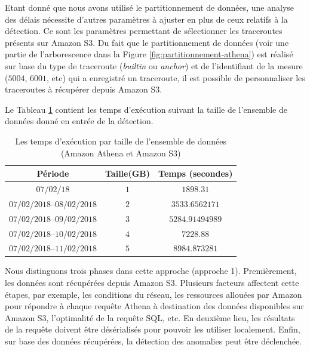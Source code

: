 Etant donné que nous avons utilisé le partitionnement de données, une analyse des délais nécessite d'autres paramètres à ajuster en plus de ceux relatifs à la détection. Ce sont les paramètres permettant de sélectionner les traceroutes présents sur Amazon S3. Du fait que le partitionnement de données (voir une partie de l'arborescence dans la Figure 	\ref{fig:partitionnement-athena}) est réalisé sur base du type de traceroute (\textit{builtin} ou \textit{anchor}) et de l'identifiant de la mesure ($ 5004 $, $6001$, etc) qui a enregistré un traceroute, il est possible de personnaliser les traceroutes à récupérer depuis Amazon S3.

Le Tableau \ref{tab:athena-data} contient les temps d'exécution suivant la taille de l'ensemble de données donné en entrée de la détection.

\begin{table}[H]
	\centering
	\captionsetup{justification=centering}
\begin{tabular}{c c c}
	\textbf{Période} & \textbf{Taille(GB)} & \textbf{Temps (secondes) } \\ 	\hline 
$ 07/02/18 $	&$ 1 $&	$ 1898.31 $ \\ 	\hline 
$ 07/02/2018 – 08/02/2018 $	&$ 2 $&	$ 3533.6562171 $ \\ 	\hline 
$ 07/02/2018 – 09/02/2018 $&	$ 3 $&	$ 5284.91494989  $ \\ 	\hline 
$ 07/02/2018 – 10/02/2018 $	&$ 4 $&$ 	7228.88 $  \\ 	\hline 
$ 07/02/2018 – 11/02/2018 $	&$ 5 $& $ 8984.873281	 $ \\ 	\hline 
\end{tabular} 
\caption{Les temps d'exécution par taille de l'ensemble de données (Amazon Athena et Amazon S3)}
\label{tab:athena-data}
\end{table}

Nous distinguons trois phases dans cette approche (approche 1). Premièrement,  les données sont récupérées depuis Amazon S3. Plusieurs facteurs affectent cette étapes, par exemple,  les conditions du réseau, les ressources allouées par Amazon pour répondre à chaque requête  Athena à destination des données disponibles sur Amazon S3, l'optimalité de la requête SQL, etc.  En deuxième lieu, les résultats de la requête doivent être désérialisés pour pouvoir les utiliser localement. Enfin, sur base des données récupérées, la détection des anomalies peut être déclenchée.

